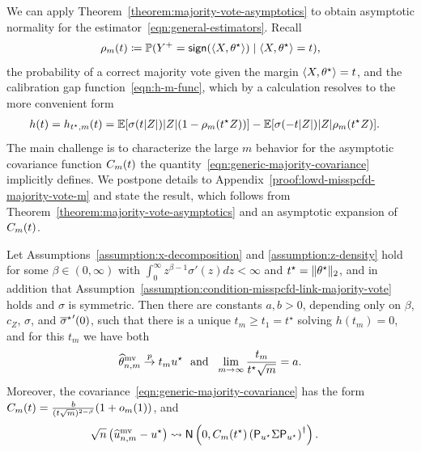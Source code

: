 
We can apply Theorem~\ref{theorem:majority-vote-asymptotics} to obtain
asymptotic normality for the
estimator~\eqref{eqn:general-estimators}. Recall
\begin{equation}
  \label{eq:link-function-m-majority-vote-general}
  \rho_m(t) \coloneqq
  \mathbb{P}(Y^+ = \mathsf{sign}(\langle X, \theta^\star\rangle) \mid \langle X,
  \theta^\star\rangle = t),
\end{equation}
the probability of a correct majority vote given the margin $\langle X,
\theta^\star\rangle = t$, and the calibration gap function~\eqref{eqn:h-m-func},
which by a calculation resolves to the more convenient form
\begin{align*}
  h(t) & = h_{t^\star, m}(t) = \mathbb{E}[\sigma(t|Z|) |Z| (1 - \rho_m(t^\star Z))]
  - \mathbb{E}[\sigma(-t |Z|) |Z| \rho_m(t^\star Z)].
\end{align*}
The main challenge is to characterize the large $m$ behavior for
the asymptotic covariance function $C_m(t)$ the
quantity~\eqref{eqn:generic-majority-covariance} implicitly
defines.
%
We postpone details to Appendix~\ref{proof:lowd-misspcfd-majority-vote-m}
and state the result, which follows from
Theorem~\ref{theorem:majority-vote-asymptotics} and an asymptotic expansion
of $C_m(t)$.

\begin{proposition}
  \label{prop:lowd-misspcfd-majority-vote-m}
  Let Assumptions~\ref{assumption:x-decomposition} and
  \ref{assumption:z-density} hold for some $\beta \in (0, \infty)$ with
  $\int_0^\infty z^{\beta - 1} \sigma'(z) dz < \infty$
  and
  $t^\star = \|{\theta^\star}\|_2$, and in addition that
  Assumption~\ref{assumption:condition-misspcfd-link-majority-vote} holds
  and $\sigma$ is symmetric.
  Then there are constants $a, b > 0$, depending only on $\beta$, $c_Z$,
  $\sigma$, and ${\overline{\sigma}^\star}'(0)$, such that there is a unique $t_m
  \geq t_1 = t^\star$ solving $h(t_m) = 0$, and for this $t_m$ we have both
  \begin{equation*}
    \widehat{\theta}^{\textup{mv}}_{n,m} \stackrel{p}{\rightarrow} t_m u^\star
    ~~ \mbox{and} ~~
    \lim_{m \to \infty} \frac{t_m}{t^\star \sqrt{m}} = a  .
  \end{equation*}
  Moreover, the covariance~\eqref{eqn:generic-majority-covariance} has the
  form $C_m(t) = \frac{b}{(t \sqrt m)^{2 - \beta}}(1 + o_m(1))$, and
  \begin{align*}
    \sqrt{n} \left(\widehat{u}^{\textup{mv}}_{n,m} - u^\star \right)
    &\rightsquigarrow \mathsf{N}\left(0, C_m(t^\star) \left({\mathsf{P}_{u^\star} \Sigma \mathsf{P}_{u^\star}}\right)^\dagger\right).
  \end{align*}
\end{proposition}

